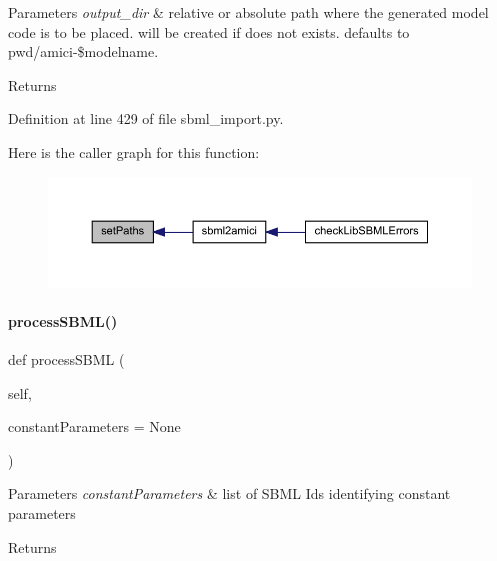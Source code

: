 \begin{DoxyParams}{Parameters}
{\em output\+\_\+dir} & relative or absolute path where the generated model code is to be placed. will be created if does not exists. defaults to {\ttfamily pwd}/amici-\/\$modelname.\\
\hline
\end{DoxyParams}
\begin{DoxyReturn}{Returns}

\end{DoxyReturn}


Definition at line 429 of file sbml\+\_\+import.\+py.

Here is the caller graph for this function\+:
\nopagebreak
\begin{figure}[H]
\begin{center}
\leavevmode
\includegraphics[width=350pt]{classamici_1_1sbml__import_1_1_sbml_importer_aa444f1d8b15c02fc5e2252cad86ae0ab_icgraph}
\end{center}
\end{figure}
\mbox{\label{classamici_1_1sbml__import_1_1_sbml_importer_ac188693ab1d9fc500d55748dbde9bf89}} 
\paragraph{\texorpdfstring{process\+S\+B\+M\+L()}{processSBML()}}
{\footnotesize\ttfamily def process\+S\+B\+ML (\begin{DoxyParamCaption}\item[{}]{self,  }\item[{}]{constant\+Parameters = {\ttfamily None} }\end{DoxyParamCaption})}


\begin{DoxyParams}{Parameters}
{\em constant\+Parameters} & list of S\+B\+ML Ids identifying constant parameters\\
\hline
\end{DoxyParams}
\begin{DoxyReturn}{Returns}

\end{DoxyReturn}


